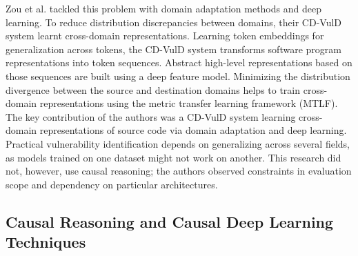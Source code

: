 \documentclass{buthesis}
\begin{document}
Zou et al. \cite{Zou2020} tackled this problem with domain adaptation methods and deep learning. To reduce distribution discrepancies between domains, their CD-VulD system learnt cross-domain representations. Learning token embeddings for generalization across tokens, the CD-VulD system transforms software program representations into token sequences. Abstract high-level representations based on those sequences are built using a deep feature model. Minimizing the distribution divergence between the source and destination domains helps to train cross-domain representations using the metric transfer learning framework (MTLF). The key contribution of the authors was a CD-VulD system learning cross-domain representations of source code via domain adaptation and deep learning. Practical vulnerability identification depends on generalizing across several fields, as models trained on one dataset might not work on another. This research did not, however, use causal reasoning; the authors observed constraints in evaluation scope and dependency on particular architectures.

\subsection{Causal Reasoning and Causal Deep Learning Techniques}
\end{document}
